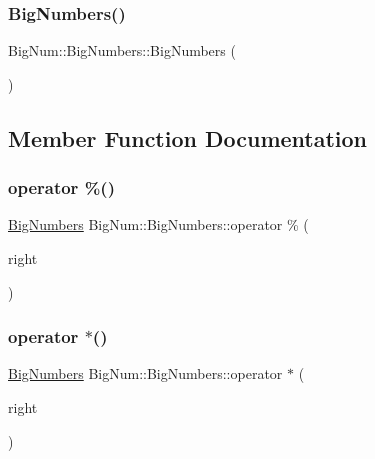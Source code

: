 \subsubsection{\texorpdfstring{BigNumbers()}{BigNumbers()}\hspace{0.1cm}{\footnotesize\ttfamily [2/2]}}
{\footnotesize\ttfamily Big\+Num\+::\+Big\+Numbers\+::\+Big\+Numbers (\begin{DoxyParamCaption}{ }\end{DoxyParamCaption})}



\subsection{Member Function Documentation}
\mbox{\label{class_big_num_1_1_big_numbers_a0d291c88f1fb0a6cd95c3baf89d6df5c}} 
\subsubsection{\texorpdfstring{operator \%()}{operator \%()}}
{\footnotesize\ttfamily \mbox{\hyperlink{class_big_num_1_1_big_numbers}{Big\+Numbers}} Big\+Num\+::\+Big\+Numbers\+::operator \% (\begin{DoxyParamCaption}\item[{const \mbox{\hyperlink{class_big_num_1_1_big_numbers}{Big\+Numbers}} \&}]{right }\end{DoxyParamCaption})}

\mbox{\label{class_big_num_1_1_big_numbers_a466d795237fe78d8b981a93b741a352b}} 
\subsubsection{\texorpdfstring{operator $\ast$()}{operator *()}}
{\footnotesize\ttfamily \mbox{\hyperlink{class_big_num_1_1_big_numbers}{Big\+Numbers}} Big\+Num\+::\+Big\+Numbers\+::operator $\ast$ (\begin{DoxyParamCaption}\item[{const \mbox{\hyperlink{class_big_num_1_1_big_numbers}{Big\+Numbers}} \&}]{right }\end{DoxyParamCaption})}

